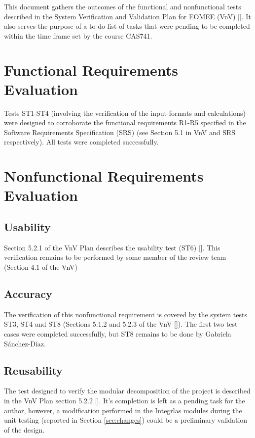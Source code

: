 \documentclass[12pt, titlepage]{article}
\begin{document}
\listoffigures %

\newpage


This document gathers the outcomes of the functional and nonfunctional tests 
described in the System Verification and Validation Plan for EOMEE (VnV) 
[\cite{VnV2020}]. It also serves the purpose of a to-do list of tasks that were 
pending to be completed within the time frame set by the course CAS741.

\section{Functional Requirements Evaluation}
Tests ST1-ST4 (involving the verification of the input formats and 
calculations) were designed to corroborate the functional requirements R1-R5 
specified in the Software Requirements Specification (SRS) (see Section 5.1 in 
VnV and SRS respectively). All tests were completed successfully.

\section{Nonfunctional Requirements Evaluation}

\subsection{Usability}
Section 5.2.1 of the VnV Plan describes the usability test (ST6) 
[\cite{VnV2020}]. This verification remains to be performed by some member of 
the review team (Section 4.1 of the VnV)
		 
\subsection{Accuracy}
The verification of this nonfunctional requirement is covered by the system 
tests ST3, ST4 and ST8 (Sections 5.1.2 and 5.2.3 of the VnV [\cite{VnV2020}]). 
The first two test cases were completed successfully, but ST8 remains to be 
done by Gabriela S\'anchez-D\'iaz.

\subsection{Reusability}
The test designed to verify the modular decomposition of the project is 
described in the VnV Plan section 5.2.2 [\cite{VnV2020}]. It's completion is 
left as a pending task for the author, however, a modification performed in the 
Integrlas modules during the unit testing (reported in Section 
\ref{sec:changes}) could be a preliminary validation of the design.
\end{document}
